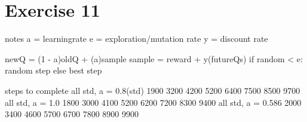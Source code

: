 \section{Exercise 11}
notes
a = learningrate
e = exploration/mutation rate
y = discount rate

newQ = (1 - a)oldQ + (a)sample
sample = reward + y(futureQs)
if random < e: random step
else best step

steps to complete
all std, a = 0.8(std)
1900
3200
4200
5200
6400
7500
8500
9700
all std, a = 1.0
1800
3000
4100
5200
6200
7200
8300
9400
all std, a = 0.586
2000
3400
4600
5700
6700
7800
8900
9900
